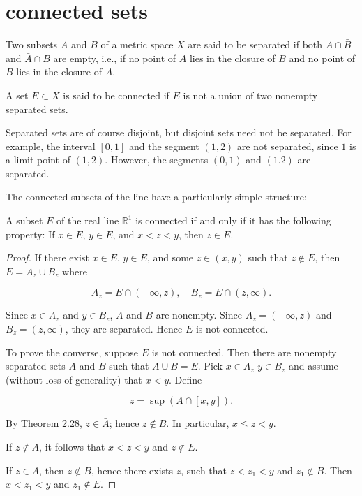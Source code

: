 \section{connected sets}

\begin{myDef}\label{myDef:2.45 separated}
    Two subsets $A$ and $B$ of a metric space $X$ are said to be
    separated if both $A \cap \bar{B}$ and $\bar{A} \cap B$ are empty, i.e., if no point of $A$ lies in the
    closure of $B$ and no point of $B$ lies in the closure of $A$.
    
    A set $E \subset X$ is said to be connected if $E$ is not a union of two nonempty separated sets.
\end{myDef}

\begin{myRemark}\label{myRemark:2.46}
    Separated sets are of course disjoint, but disjoint sets need not
    be separated. For example, the interval $[0,1]$ and the segment $(1, 2) $ are not
    separated, since $1$ is a limit point of $(1, 2)$. However, the segments $(0, 1)$ and $(1. 2)$ are separated.
    
    The connected subsets of the line have a particularly simple structure:
\end{myRemark}

\begin{thm}
    A subset $E$ of the real line $\mathbb{R}^1$ is connected if and only if it has the following property: If $x \in E$, $y \in E$, and $x < z <y$, then $z \in E$.
\end{thm}

\begin{proof}
If there exist $x \in  E$, $y \in E$, and some $z \in (x, y)$ such that $z \not\in E$, then
$E = A_z \cup B_z$ where

\begin{equation*}
    A_z = E \cap (-\infty, z),\quad
    B_z = E \cap (z, \infty).
\end{equation*}


Since $x \in A_z$ and $y \in B_z$, $A$ and $B$ are nonempty. Since $A_z = (-\infty, z)$ and $B_z = (z, \infty)$, they are separated. Hence $E$ is not connected.

To prove the converse, suppose $E$ is not connected. Then there are
nonempty separated sets $A$ and $B$ such that $A \cup B=E$. Pick $x \in  A_z$ $y \in  B_z$
and assume (without loss of generality) that $x <y$. Define

\begin{equation*}
    z = \sup(A \cap [x, y]).
\end{equation*}

By Theorem 2.28, $z \in \bar{A}$; hence $z \not\in  B$. In particular, $x \leq z <y$.

If $z \not\in A$, it follows that $x < z < y$ and $z \not\in E$.

If $z \in  A$, then $z \not\in B$, hence there exists $z$, such that $z<z_1 <y$ and
$z_1 \not\in  B$. Then $x<z_1 <y$ and $z_1 \not\in  E$.
\end{proof}